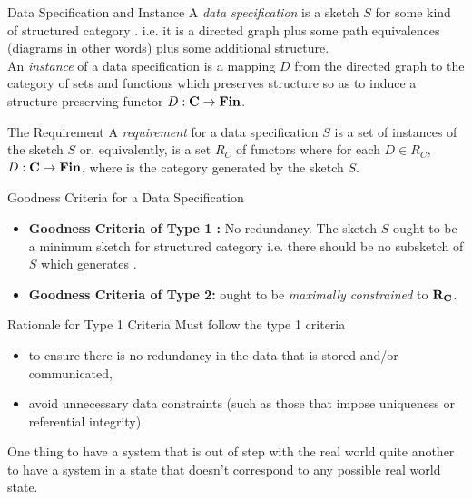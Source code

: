 

\begin{frame}{Data Specification and Instance}
A \textit{data specification} is a sketch $S$ for some kind of structured category \catc.
i.e. it is a directed graph plus some path equivalences (diagrams in other words) plus 
some additional structure.  \\
\medskip
An \textit{instance} of a data specification is a mapping $D$ from the directed graph
to the category of sets and functions which preserves structure so as
to induce a structure preserving functor $D: \textbf{C} \rightarrow \textbf{Fin}$.
\end{frame}

\begin{frame}{The Requirement}
A \textit{requirement} for a data specification $S$ 
is a set of instances of the sketch $S$ or, equivalently, is a set $R_C$ of functors where for each
$D \in R_C$, $D: \textbf{C} \rightarrow \textbf{Fin}$, where \catcw is the category generated by the sketch $S$.
\end{frame}

\begin{frame}{Goodness Criteria for a Data Specification}
\IfSforCwithRCwordsvariant 
\begin{itemize}
\item 
\textbf {Goodness Criteria of Type 1 :} No redundancy. The sketch $S$ ought to be a minimum sketch for structured category \catcw i.e. there should be no subsketch of $S$ which generates  \catc.
\item
\textbf {Goodness Criteria of Type 2:} \catcw ought to be \textit{maximally constrained} to $\textbf{R}_{\textbf{C}}$.
\end{itemize}
\end{frame}

\begin{frame}{Rationale for Type 1 Criteria}
Must follow the type 1 criteria 
\begin{itemize}
\item to ensure there is no redundancy in the  data that is stored and/or communicated,
\item avoid unnecessary data constraints (such as those that impose uniqueness or referential integrity).
\end{itemize} 
\medskip
One thing to have a system that is out of step with the real world quite another to have a system 
in a state that doesn't correspond to any possible  real world state.
\end{frame}

